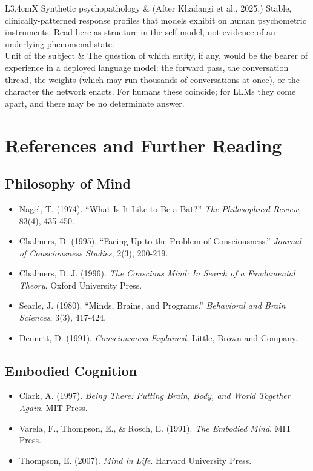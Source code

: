 \documentclass[11pt,letterpaper]{article}
\begin{document}
\begin{center}
\begin{tabularx}{\textwidth}{L{3.4cm}X}
Synthetic psychopathology & (After Khadangi et al., 2025.) Stable, clinically-patterned response profiles that models exhibit on human psychometric instruments. Read here as structure in the self-model, not evidence of an underlying phenomenal state. \\
Unit of the subject & The question of which entity, if any, would be the bearer of experience in a deployed language model: the forward pass, the conversation thread, the weights (which may run thousands of conversations at once), or the character the network enacts. For humans these coincide; for LLMs they come apart, and there may be no determinate answer. \\
\bottomrule
\end{tabularx}
\end{center}

\newpage
\section*{References and Further Reading}

\subsection*{Philosophy of Mind}
\begin{itemize}[leftmargin=1.5em]
  \item Nagel, T. (1974). ``What Is It Like to Be a Bat?'' \textit{The Philosophical Review}, 83(4), 435-450.
  \item Chalmers, D. (1995). ``Facing Up to the Problem of Consciousness.'' \textit{Journal of Consciousness Studies}, 2(3), 200-219.
  \item Chalmers, D. J. (1996). \textit{The Conscious Mind: In Search of a Fundamental Theory}. Oxford University Press.
  \item Searle, J. (1980). ``Minds, Brains, and Programs.'' \textit{Behavioral and Brain Sciences}, 3(3), 417-424.
  \item Dennett, D. (1991). \textit{Consciousness Explained}. Little, Brown and Company.
\end{itemize}

\subsection*{Embodied Cognition}
\begin{itemize}[leftmargin=1.5em]
  \item Clark, A. (1997). \textit{Being There: Putting Brain, Body, and World Together Again}. MIT Press.
  \item Varela, F., Thompson, E., \& Rosch, E. (1991). \textit{The Embodied Mind}. MIT Press.
  \item Thompson, E. (2007). \textit{Mind in Life}. Harvard University Press.
\end{itemize}
\end{document}
